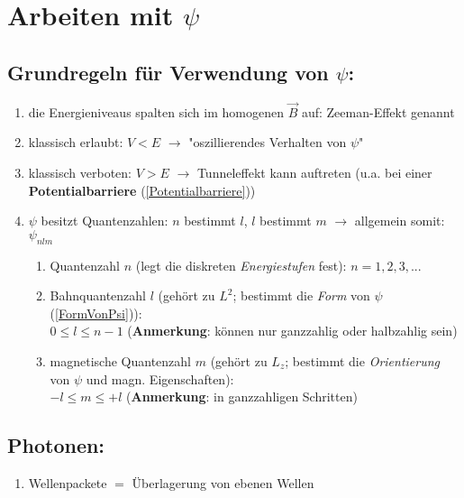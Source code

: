 \section{Arbeiten mit $\psi$}

\subsection{Grundregeln für Verwendung von $\psi$:}
\begin{enumerate}
    \item die Energieniveaus spalten sich im homogenen $\vec{B}$ auf: Zeeman-Effekt genannt
    \item klassisch erlaubt: $V<E$ $\rightarrow$ "oszillierendes Verhalten von $\psi$"
    \item klassisch verboten: $V>E$ $\rightarrow$ Tunneleffekt kann auftreten (u.a. bei einer \textbf{Potentialbarriere} (\ref{Potentialbarriere}))
    \item $\psi$ besitzt Quantenzahlen: $n$ bestimmt $l$, $l$ bestimmt $m$ $\rightarrow$ allgemein somit: $\psi_{nlm}$
    \begin{enumerate}
        \item Quantenzahl $n$ (legt die diskreten \textit{Energiestufen} fest): $n=1,2,3,...$
        \item Bahnquantenzahl $l$ (gehört zu $L^2$; bestimmt die \textit{Form} von $\psi$ (\ref{FormVonPsi})):\\
        $0\leq l\leq n-1$ (\textbf{Anmerkung}: können nur ganzzahlig oder halbzahlig sein)
        \item magnetische Quantenzahl $m$ (gehört zu $L_z$; bestimmt die \textit{Orientierung} von $\psi$ und magn. Eigenschaften):\\
        $-l\leq m \leq +l$ (\textbf{Anmerkung}: in ganzzahligen Schritten)
    \end{enumerate}
\end{enumerate}

\subsection{Photonen:}
\begin{enumerate}
    \item Wellenpackete $=$ Überlagerung von ebenen Wellen \label{Wellenpackete}
\end{enumerate}

